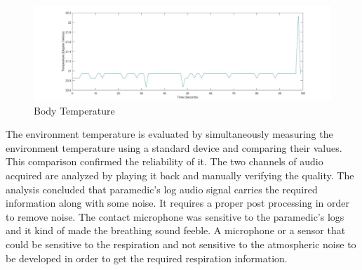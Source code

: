 \begin{figure}[h]
	\centering
	\includegraphics[scale = 0.22 ]{btemp_result.jpg}
	\caption{Body Temperature\label{fig:btemp_res}}
\end{figure}

The environment temperature is evaluated by simultaneously measuring the environment temperature using a standard device and comparing their values. This comparison confirmed the reliability of it. 
The two channels of audio acquired are analyzed by playing it back and manually verifying the quality. The analysis concluded that paramedic's log audio signal carries the required information along with some noise. It requires a proper post processing in order to remove noise. The contact microphone was sensitive to the paramedic's logs and it kind of made the breathing sound feeble. A microphone or a sensor that could be sensitive to the respiration and not sensitive to the atmospheric noise to be developed in order to get the required respiration information.



